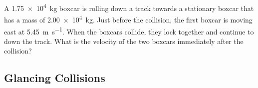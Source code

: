 \begin{example}
  A \SI{1.75e4}{\kilo\gram} boxcar is rolling down a track towards a stationary
  boxcar that has a mass of \SI{2.00e4}{\kilo\gram}. Just before the collision,
  the first boxcar is moving east at \SI{5.45}{\metre\per\second}. When the
  boxcars collide, they lock together and continue to down the track. What is
  the velocity of the two boxcars immediately after the collision?
  \begin{center}
  \end{center}
\end{example}
%
%
%
%
%
%
%
%
%
\subsection{Glancing Collisions}
%  
%
%
%
%
%
